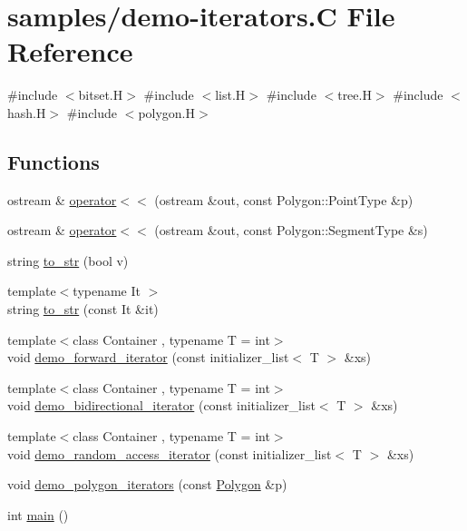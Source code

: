\hypertarget{demo-iterators_8_c}{}\section{samples/demo-\/iterators.C File Reference}
\label{demo-iterators_8_c}
{\ttfamily \#include $<$bitset.\+H$>$}\newline
{\ttfamily \#include $<$list.\+H$>$}\newline
{\ttfamily \#include $<$tree.\+H$>$}\newline
{\ttfamily \#include $<$hash.\+H$>$}\newline
{\ttfamily \#include $<$polygon.\+H$>$}\newline
\subsection*{Functions}
\begin{DoxyCompactItemize}
\item 
ostream \& \hyperlink{demo-iterators_8_c_a923e96e2eb2a21cf7d668e804417c47a}{operator$<$$<$} (ostream \&out, const Polygon\+::\+Point\+Type \&p)
\item 
ostream \& \hyperlink{demo-iterators_8_c_aeeb3d06d99a03eacdce5a549712941cb}{operator$<$$<$} (ostream \&out, const Polygon\+::\+Segment\+Type \&s)
\item 
string \hyperlink{demo-iterators_8_c_af423c937ed0522544ed90c34b85d897e}{to\+\_\+str} (bool v)
\item 
{\footnotesize template$<$typename It $>$ }\\string \hyperlink{demo-iterators_8_c_af8bbc1c2b472077a39826f8635457c12}{to\+\_\+str} (const It \&it)
\item 
{\footnotesize template$<$class Container , typename T  = int$>$ }\\void \hyperlink{demo-iterators_8_c_a971180b8ea13c61009c451fe7a942839}{demo\+\_\+forward\+\_\+iterator} (const initializer\+\_\+list$<$ T $>$ \&xs)
\item 
{\footnotesize template$<$class Container , typename T  = int$>$ }\\void \hyperlink{demo-iterators_8_c_a26a099cedf4512aa8f05c2dd18e4b3d2}{demo\+\_\+bidirectional\+\_\+iterator} (const initializer\+\_\+list$<$ T $>$ \&xs)
\item 
{\footnotesize template$<$class Container , typename T  = int$>$ }\\void \hyperlink{demo-iterators_8_c_ad21d9d25e5563ab0ee7ebd1a3092b1df}{demo\+\_\+random\+\_\+access\+\_\+iterator} (const initializer\+\_\+list$<$ T $>$ \&xs)
\item 
void \hyperlink{demo-iterators_8_c_a17b3db72ea3737c300ed830ce644aba8}{demo\+\_\+polygon\+\_\+iterators} (const \hyperlink{class_designar_1_1_polygon}{Polygon} \&p)
\item 
int \hyperlink{demo-iterators_8_c_ae66f6b31b5ad750f1fe042a706a4e3d4}{main} ()
\end{DoxyCompactItemize}


